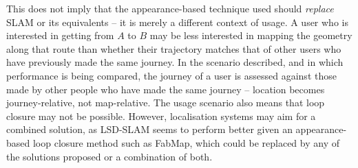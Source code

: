 This does not imply that the appearance-based technique used should \textit{replace} SLAM or its equivalents -- it is merely a different context of usage. A user who is interested in getting from $A$ to $B$ may be less interested in mapping the geometry along that route than whether their trajectory matches that of other users who have previously made the same journey. In the scenario described, and in which performance is being compared, the journey of a user is assessed against those made by other people who have made the same journey -- location becomes journey-relative, not map-relative. The usage scenario also means that loop closure may not be possible. However, localisation systems may aim for a combined solution, as LSD-SLAM seems to perform better given an appearance-based loop closure method \citep{engel14eccv} such as FabMap, which could be replaced by any of the solutions proposed \citep{Rivera-Rubio2015PRL} or a combination of both.


